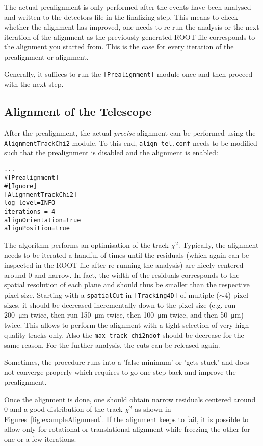 The actual prealignment is only performed after the events have been analysed and written to the detectors file in the finalizing step. 
This means to check whether the alignment has improved, one needs to re-run the analysis or the next iteration of the alignment as the previously generated ROOT file corresponds to the alignment you started from.
This is the case for every iteration of the prealignment or alignment.

Generally, it suffices to run the \texttt{[Prealignment]} module once and then proceed with the next step.

\subsection*{Alignment of the Telescope}
After the prealignment, the actual \textit{precise} alignment can be performed using the \texttt{AlignmentTrackChi2} module.
To this end, \texttt{align\_tel.conf} needs to be modified such that the prealignment is disabled and the alignment is enabled:
\begin{verbatim}
...
#[Prealignment]
#[Ignore]
[AlignmentTrackChi2]
log_level=INFO
iterations = 4
alignOrientation=true
alignPosition=true
\end{verbatim}

The algorithm performs an optimisation of the track $\chi^2$.
Typically, the alignment needs to be iterated a handful of times until the residuals (which again can be inspected in the ROOT file after re-running the analysis) are nicely centered around 0 and narrow.
In fact, the width of the residuals corresponds to the spatial resolution of each plane and should thus be smaller than the respective pixel size.
Starting with a \texttt{spatialCut} in \texttt{[Tracking4D]} of multiple ($\sim4$) pixel sizes, it should be decreased incrementally down to the pixel size (e.g. run \SI{200}{\micro\m} twice, then run \SI{150}{\micro\m} twice, then \SI{100}{\micro\m} twice, and then \SI{50}{\micro\m}) twice.
This allows to perform the alignment with a tight selection of very high quality tracks only.
Also the \texttt{max\_track\_chi2ndof} should be decrease for the same reason.
For the further analysis, the cuts can be released again.

Sometimes, the procedure runs into a 'false minimum' or 'gets stuck' and does not converge properly which requires to go one step back and improve the prealignment.

Once the alignment is done, one should obtain narrow residuals centered around 0 and a good distribution of the track $\chi^2$ as shown in Figures~\ref{fig:exampleAlignment}.
If the alignment keeps to fail, it is possible to allow only for rotational or translational alignment while freezing the other for one or a few iterations.

